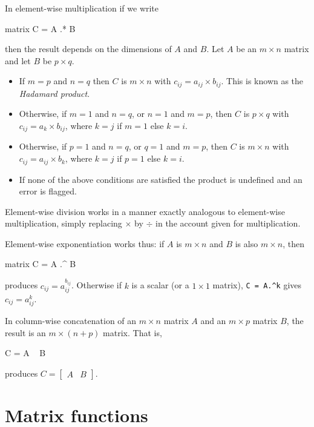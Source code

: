 In element-wise multiplication if we write
%
\begin{code}
matrix C = A .* B
\end{code}
% 
then the result depends on the dimensions of $A$ and $B$.  Let $A$ be
an $m \times n$ matrix and let $B$ be $p \times q$.  
%
\begin{itemize}
\item If $m=p$ and $n=q$ then $C$ is $m\times n$ with $c_{ij} = a_{ij}
  \times b_{ij}$.  This is known as the \emph{Hadamard product}.
\item Otherwise, if $m=1$ and $n=q$, or $n=1$ and $m=p$, then $C$ is
  $p\times q$ with $c_{ij} = a_k \times b_{ij}$, where $k=j$ if $m=1$
  else $k=i$.
\item Otherwise, if $p=1$ and $n=q$, or $q=1$ and $m=p$, then $C$ is
  $m\times n$ with $c_{ij} = a_{ij} \times b_k$, where $k=j$ if $p=1$
  else $k=i$.
\item If none of the above conditions are satisfied the product is
  undefined and an error is flagged.
\end{itemize}

Element-wise division works in a manner exactly analogous to
element-wise multiplication, simply replacing $\times$ by $\div$ in
the account given for multiplication.

Element-wise exponentiation works thus: if $A$ is $m\times n$ and $B$
is also $m\times n$, then
%
\begin{code}
matrix C = A .^ B
\end{code}
% 
produces $c_{ij} = a_{ij}^{b_{ij}}$.  Otherwise if $k$ is a scalar (or a
$1\times 1$ matrix), \verb|C = A.^k| gives $c_{ij} = a_{ij}^k$.

In column-wise concatenation of an $m\times n$ matrix $A$ and
an $m\times p$ matrix $B$, the result is an $m\times (n+p)$ matrix.
That is,
%
\begin{code}
C = A ~ B
\end{code}
% 
produces $C = \left[ \begin{array}{cc} A & B \end{array} \right]$.

\section{Matrix functions}
\label{matrix-func}

